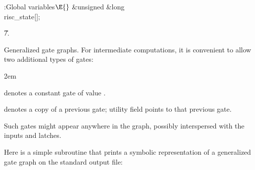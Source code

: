 \B{}:Global variables\X${}\E{}$\6
\&{unsigned} \&{long} \\{risc\_state}[];\par
\U7.\fi

Generalized gate graphs. For intermediate computations, it is
convenient to allow two additional types of gates:
{\advance\parindent 2em
\smallskip
\item{} denotes a constant gate of value .

\smallskip
\item{} denotes a copy of a previous gate; utility field 
points to that previous gate.

\smallskip}\noindent
Such gates might appear anywhere in the graph, possibly interspersed with
the inputs and latches.

Here is a simple subroutine that prints a symbolic representation of
a generalized gate graph on the standard output file:

